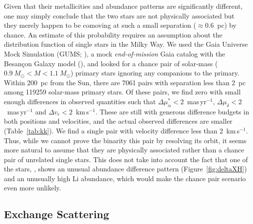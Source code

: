\documentclass[modern, letterpaper]{aastex61}
\newcommand{\figname}{Figure}
\newcommand*\elem[1]{\ensuremath{\mathrm{#1}}}
\newcommand{\bizarreone}{\text{Kronos}}
\renewcommand\tablename{Table}
\begin{document}
Given that their metallicities and abundance patterns are significantly
different, one may simply conclude that the two stars are not physically
associated but they merely happen to be comoving at such a small separation
($\approx 0.6$~pc) by chance.
An estimate of this probability requires an assumption about the distribution
function of single stars in the Milky Way.
We used the Gaia Universe Mock Simulation (GUMS; \citealt{gums}), a mock
\emph{end-of-mission} Gaia catalog with the Besançon Galaxy model
(\citealt{besancon}), and looked for a chance pair of solar-mass
($0.9~M_\odot< M < 1.1~M_\odot$) primary stars ignoring any companions to the primary.
Within 200~pc from the Sun, there are 7061 pairs
with separation less than 2~pc among 119259 solar-mass primary stars.
Of these pairs, we find zero with small enough differences in observed
quantities such that
$\Delta \mu_\alpha^* < 2$~mas\,yr$^{-1}$,
$\Delta \mu_\delta<2$~mas\,yr$^{-1}$ and $\Delta v_r < 2$~km\,s$^{-1}$.
These are still with generous difference budgets in both positions and
velocities, and the actual observed differences are smaller
(\tablename~\ref{tab:kk}).
We find a single pair with velocity difference less than 2~km\,s$^{-1}$.
Thus, while we cannot prove the binarity this pair by resolving its orbit,
it seems more natural to assume that they are physically associated rather than
a chance pair of unrelated single stars.
This does not take into account the fact that one of the stars,
\bizarreone, shows an unusual abundance difference pattern
(\figname~\ref{fig:deltaXH}) and an unusually high \elem{Li} abundance,
which would make the chance pair scenario even more unlikely.



\subsection{Exchange Scattering}
\label{sub:exchange_scattering}
\end{document}
